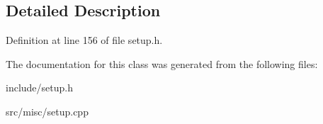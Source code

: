 \subsection{Detailed Description}


Definition at line 156 of file setup.\-h.



The documentation for this class was generated from the following files\-:\begin{DoxyCompactItemize}
\item 
include/setup.\-h\item 
src/misc/setup.\-cpp\end{DoxyCompactItemize}
